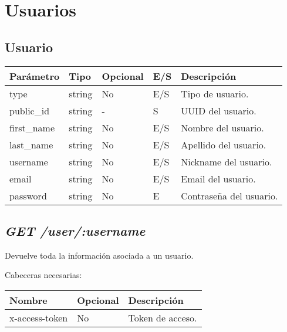 \pagebreak
\section{Usuarios}

\subsection{Usuario}
\label{sec:usuario}
\begin{table}[h!]
	\centering
	\begin{adjustbox}{max width=\textwidth}
	\begin{tabular}{|l|l|l|l|l|}
		\hline
		Parámetro & Tipo & Opcional & E/S & Descripción \\ \hline
		type & string & No & E/S & Tipo de usuario. \\ \hline
		public\_id & string & - & S & UUID del usuario. \\ \hline
		first\_name & string & No & E/S & Nombre del usuario. \\ \hline
		last\_name & string & No & E/S & Apellido del usuario. \\ \hline
		username & string & No & E/S & Nickname del usuario. \\ \hline
		email & string & No & E/S & Email del usuario. \\ \hline
		password & string & No & E & Contraseña del usuario. \\ \hline
	\end{tabular}
\end{adjustbox}
\end{table}

\subsection{\textit{GET /user/:username}}
Devuelve toda la información asociada a un usuario.

Cabeceras necesarias:
\begin{table}[h!]
	\centering
	\begin{adjustbox}{max width=\textwidth}
	\begin{tabular}{|l|l|l|}
		\hline
		Nombre & Opcional & Descripción \\ \hline
		x-access-token & No & Token de acceso. \\ \hline
	\end{tabular}
\end{adjustbox}
\end{table}

